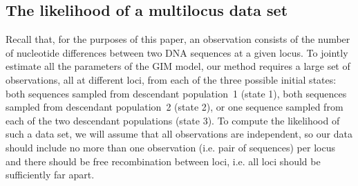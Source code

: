 \documentclass[11pt]{article}
\begin{document}
\subsection{The likelihood of a multilocus data set}
Recall that, for the purposes of this paper, an observation consists of the number of nucleotide differences between two DNA sequences at a given locus. To jointly estimate all the parameters of the GIM model,  
our method requires a large 
set of observations, all at different loci, from each of the three possible initial states: both sequences sampled from descendant population~1
(state 1), both sequences sampled from 
descendant population~2 (state 2), or one sequence sampled from each of the two descendant populations 
(state 3). 
To compute the likelihood of such a data set, we will assume that all observations are independent, so our data should include no more than one observation (i.e. pair of sequences) per locus and there should be free recombination between loci, i.e. all loci should be sufficiently far apart. 
\end{document}
